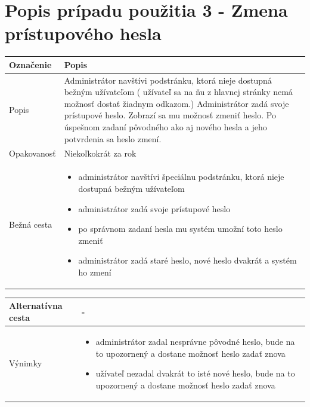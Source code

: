 \documentclass[12pt,a4paper]{report}
\begin{document}
\pagebreak
\section[Popis prípadu použitia 3 - Zmena prístupového hesla]{\rmfamily\bfseries
	Popis prípadu použitia 3 - Zmena prístupového hesla}
\begin{table}[h!]
	\centering
	\begin{tabular}{|>{\centering\arraybackslash}m{3in}|>{\centering\arraybackslash}m{3in}|}
		\hline
		\centering Označenie & Popis \\ [0ex]
		\hline
		Popis & Administrátor navštívi podstránku, ktorá nieje dostupná bežným užívateľom (
		užívateľ sa na ňu z hlavnej stránky nemá možnosť dostať žiadnym odkazom.) Administrátor
		zadá svoje prístupové heslo. Zobrazí sa mu možnosť zmeniť heslo. Po úspešnom zadaní pôvodného ako aj nového hesla a jeho potvrdenia sa heslo zmení.\\ [0ex]
		\hline
		Opakovanosť & Niekoľkokrát za rok \\ [0ex]
		\hline
		Bežná cesta & 	\begin{itemize}
			\item administrátor navštívi špeciálnu podstránku, ktorá nieje dostupná bežným užívateľom
			\item administrátor zadá svoje prístupové heslo
			\item po správnom zadaní hesla mu systém umožní toto heslo zmeniť
			\item administrátor zadá staré heslo, nové heslo dvakrát a systém ho zmení	
		\end{itemize} \\ [0ex]
		\hline
	\end{tabular}
\end{table}
\begin{table}[h!]
	\centering
	\begin{tabular}{|>{\centering\arraybackslash}m{3in}|>{\centering\arraybackslash}m{3in}|}
		\hline
		Alternatívna cesta & - \\ [0ex]
		\hline
		Výnimky &\begin{itemize}
			\item administrátor zadal nesprávne pôvodné heslo, bude na to upozornený a dostane možnosť heslo zadať znova
			\item užívateľ nezadal dvakrát to isté nové heslo, bude na to upozornený a dostane možnosť heslo zadať znova
		\end{itemize} \\ [0ex]
		\hline
	\end{tabular}
\end{table}
\end{document}
